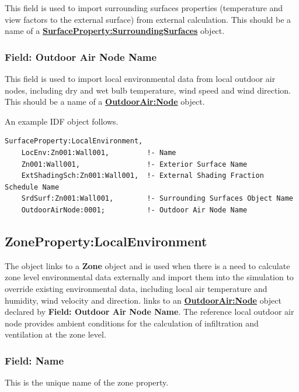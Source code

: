 This field is used to import surrounding surfaces properties (temperature and view factors to the external surface) from external calculation. This should be a name of a \textbf{\hyperref[surfacePropertysurroundingSurfaces]{SurfaceProperty:SurroundingSurfaces}} object.

\subsubsection{Field: Outdoor Air Node Name}\label{field-outdoor-air-node-name}

This field is used to import local environmental data from local outdoor air nodes, including dry and wet bulb temperature, wind speed and wind direction. This should be a name of a \textbf{\hyperref[outdoorairnode]{OutdoorAir:Node}} object.

An example IDF object follows.

\begin{lstlisting}
SurfaceProperty:LocalEnvironment,
    LocEnv:Zn001:Wall001,         !- Name
    Zn001:Wall001,                !- Exterior Surface Name
    ExtShadingSch:Zn001:Wall001,  !- External Shading Fraction Schedule Name
    SrdSurf:Zn001:Wall001,        !- Surrounding Surfaces Object Name
    OutdoorAirNode:0001;          !- Outdoor Air Node Name
\end{lstlisting}

\subsection{ZoneProperty:LocalEnvironment}\label{ZonePropertylocalEnvironment}

The object links to a \textbf{Zone} object and is used when there is a need to calculate zone level environmental data externally and import them into the simulation to override existing environmental data, including local air temperature and humidity, wind velocity and direction. links to an \textbf{\hyperref[outdoorairnode]{OutdoorAir:Node}} object declared by \textbf{Field: Outdoor Air Node Name}. The reference local outdoor air node provides ambient conditions for the calculation of infiltration and ventilation at the zone level.

\subsubsection{Field: Name}\label{field-zone-localenv-name}

This is the unique name of the zone property.

